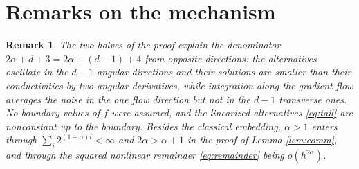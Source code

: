 \documentclass[11pt]{article}
\numberwithin{equation}{section}
\newtheorem{remark}[theorem]{Remark}
\begin{document}
\section{Remarks on the mechanism}\label{sec:remarks}

\begin{remark}
The two halves of the proof explain the denominator
$2\alpha+d+3=2\alpha+(d-1)+4$ from opposite directions: the alternatives oscillate in the $d-1$
angular directions and their solutions are smaller than their
conductivities by two angular derivatives, while integration along the
gradient flow averages the noise in the one flow direction but not in
the $d-1$ transverse ones. No boundary values of $f$ were assumed, and
the linearized alternatives \eqref{eq:tail} are nonconstant up to the
boundary. Besides the classical embedding, $\alpha>1$ enters through
$\sum_i2^{(1-\alpha)i}<\infty$ and $2\alpha>\alpha+1$ in the proof of
Lemma \ref{lem:comm}, and through the squared nonlinear remainder
\eqref{eq:remainder} being $o(h^{2\alpha})$.
\end{remark}
\end{document}
